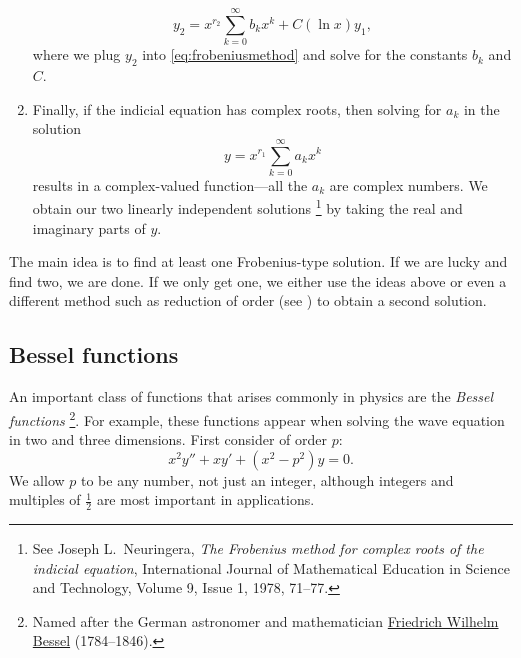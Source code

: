 \documentclass{ximera}
\begin{document}
\begin{enumerate}
\begin{equation*}
            y_2 = x^{r_2} \sum_{k=0}^\infty b_k x^{k} + C (\ln x) y_1 ,
        \end{equation*}
        where we plug $y_2$ into \eqref{eq:frobeniusmethod} and solve for the constants $b_k$ and $C$.
    \item Finally, if the indicial equation has complex roots, then solving for $a_k$ in the solution
        \begin{equation*}
            y = x^{r_1} \sum_{k=0}^\infty a_k x^{k}
        \end{equation*}
        results in a complex-valued function---all the $a_k$ are complex numbers.  We obtain our two linearly independent solutions%
        \footnote{
            See Joseph L.\ Neuringera, \emph{The Frobenius method for complex roots of the indicial equation}, International Journal of Mathematical Education in Science and Technology, Volume 9, Issue 1, 1978, 71--77.
            } 
        by taking the real and imaginary parts of $y$.
\end{enumerate}

The main idea is to find at least one Frobenius-type solution.  If we are lucky and find two, we are done. If we only get one, we either use the ideas above or even a different method such as reduction of order (see ) to obtain a second solution.

\subsection{Bessel functions} \label{bessel:subsection}

An important class of functions that arises commonly in physics are the \emph{Bessel functions}%
\footnote{Named after the German astronomer and mathematician \href{http://en.wikipedia.org/wiki/Friedrich_Bessel}{Friedrich Wilhelm Bessel} (1784--1846).}. 
For example, these functions appear when solving the wave equation in two and three dimensions.  First consider \emph{} of order $p$:
\begin{equation*}
    x^2 y'' + xy' + \left(x^2 - p^2\right)y = 0 .
\end{equation*}
We allow $p$ to be any number, not just an integer, although integers and multiples of $\frac{1}{2}$ are most important in applications.
\end{document}
